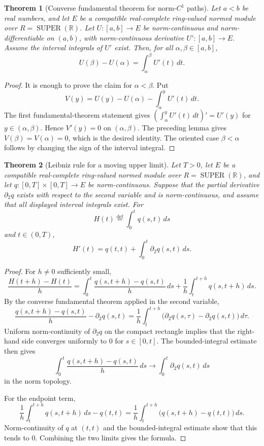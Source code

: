 \documentclass{amsart}
\newtheorem{thm}{Theorem}
\DeclareMathOperator{\SUPER}{SUPER}
\newcommand{\eqdef}{\overset{\mathrm{def}}{=}}
\begin{document}
\begin{thm}[Converse fundamental theorem for norm-$C^1$ paths]
Let $a<b$ be real numbers, and let $E$ be a compatible real-complete
ring-valued normed module over $R=\SUPER(\mathbb{R})$.  Let
$U:[a,b]\to E$ be norm-continuous and norm-differentiable on $(a,b)$, with
norm-continuous derivative $U':[a,b]\to E$.  Assume the interval integrals of
$U'$ exist.  Then, for all $\alpha,\beta\in[a,b]$,
\[
  U(\beta)-U(\alpha)=\int_\alpha^\beta U'(t)\,dt .
\]
\end{thm}

\begin{proof}
It is enough to prove the claim for $\alpha<\beta$.  Put
\[
  V(y)=U(y)-U(\alpha)-\int_\alpha^y U'(t)\,dt .
\]
The first fundamental-theorem statement gives
$\left(\int_\alpha^y U'(t)\,dt\right)'=U'(y)$ for $y\in(\alpha,\beta)$.
Hence $V'(y)=0$ on $(\alpha,\beta)$.  The preceding lemma gives
$V(\beta)=V(\alpha)=0$, which is the desired identity.  The oriented case
$\beta<\alpha$ follows by changing the sign of the interval integral.
\end{proof}

\begin{thm}[Leibniz rule for a moving upper limit]
Let $T>0$, let $E$ be a compatible real-complete ring-valued normed module
over $R=\SUPER(\mathbb{R})$, and let $q:[0,T]\times[0,T]\to E$ be
norm-continuous.  Suppose that the partial derivative $\partial_2 q$ exists
with respect to the second variable and is norm-continuous, and assume that
all displayed interval integrals exist.  For
\[
  H(t)\eqdef\int_0^t q(s,t)\,ds
\]
and $t\in(0,T)$,
\[
  H'(t)=q(t,t)+\int_0^t \partial_2q(s,t)\,ds .
\]
\end{thm}

\begin{proof}
For $h\neq0$ sufficiently small,
\[
  \frac{H(t+h)-H(t)}{h}
  =
  \int_0^t\frac{q(s,t+h)-q(s,t)}{h}\,ds
  +\frac{1}{h}\int_t^{t+h}q(s,t+h)\,ds .
\]
By the converse fundamental theorem applied in the second variable,
\[
  \frac{q(s,t+h)-q(s,t)}{h}-\partial_2q(s,t)
  =
  \frac{1}{h}\int_t^{t+h}
  \bigl(\partial_2q(s,\tau)-\partial_2q(s,t)\bigr)\,d\tau .
\]
Uniform norm-continuity of $\partial_2q$ on the compact rectangle implies
that the right-hand side converges uniformly to $0$ for
$s\in[0,t]$.  The bounded-integral estimate then gives
\[
  \int_0^t\frac{q(s,t+h)-q(s,t)}{h}\,ds
  \longrightarrow
  \int_0^t\partial_2q(s,t)\,ds
\]
in the norm topology.

For the endpoint term,
\[
  \frac{1}{h}\int_t^{t+h}q(s,t+h)\,ds-q(t,t)
  =
  \frac{1}{h}\int_t^{t+h}\bigl(q(s,t+h)-q(t,t)\bigr)\,ds .
\]
Norm-continuity of $q$ at $(t,t)$ and the bounded-integral estimate show that
this tends to $0$.  Combining the two limits gives the formula.
\end{proof}
\end{document}
